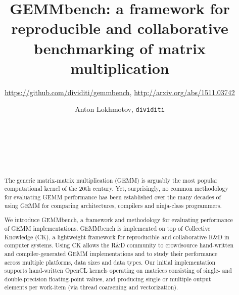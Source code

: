 \documentclass{acm_proc_article-sp} %
\begin{document}
\title{{GEMMbench}: a framework for reproducible and collaborative benchmarking
of matrix multiplication}
%
\subtitle{\LARGE \url{https://github.com/dividiti/gemmbench}, \url{http://arxiv.org/abs/1511.03742}}

\author{
\alignauthor
  Anton Lokhmotov, {\Large \tt dividiti}\\
  \\
  \\
  \\
  \\
  \\
}

\maketitle

\begin{abstract}

The generic matrix-matrix multiplication (GEMM) is arguably the most popular
computational kernel of the 20th century.
%
Yet, surprisingly, no common methodology for evaluating GEMM performance
has been established over the many decades of using GEMM for comparing
architectures, compilers and ninja-class programmers.

We introduce GEMMbench, a framework and methodology for evaluating performance
of GEMM implementations.
%
GEMMbench is implemented on top of Collective Knowledge (CK), a lightweight
framework for reproducible and collaborative R\&D in computer systems.
%
Using CK allows the R\&D community to crowdsource hand-written and
compiler-generated GEMM implementations and to study their performance across
multiple platforms, data sizes and data types.
%
Our initial implementation supports hand-written OpenCL kernels operating on
matrices consisting of single- and double-precision floating-point values, and
producing single or multiple output elements per work-item (via thread
coarsening and vectorization).


\end{abstract}

\end{document}
